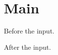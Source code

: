 \documentclass{article}
\begin{document}
\section{Main}
Before the input.

After the input.
\end{document}
